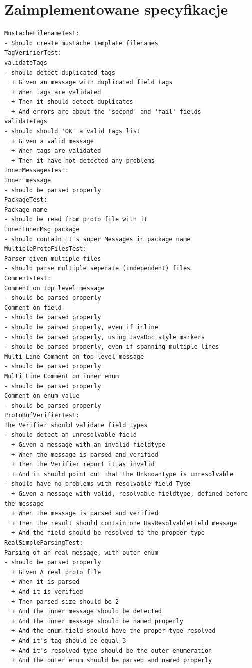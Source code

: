 \documentclass[pdflatex,11pt]{aghdpl}
\begin{document}
\section{Zaimplementowane specyfikacje}
\begin{verbatim}
MustacheFilenameTest:
- Should create mustache template filenames
TagVerifierTest:
validateTags 
- should detect duplicated tags
  + Given an message with duplicated field tags 
  + When tags are validated 
  + Then it should detect duplicates 
  + And errors are about the 'second' and 'fail' fields 
validateTags 
- should should 'OK' a valid tags list
  + Given a valid message 
  + When tags are validated 
  + Then it have not detected any problems 
InnerMessagesTest:
Inner message 
- should be parsed properly
PackageTest:
Package name 
- should be read from proto file with it
InnerInnerMsg package 
- should contain it's super Messages in package name
MultipleProtoFilesTest:
Parser given multiple files 
- should parse multiple seperate (independent) files
CommentsTest:
Comment on top level message 
- should be parsed properly
Comment on field 
- should be parsed properly
- should be parsed properly, even if inline
- should be parsed properly, using JavaDoc style markers
- should be parsed properly, even if spanning multiple lines
Multi Line Comment on top level message 
- should be parsed properly
Multi Line Comment on inner enum 
- should be parsed properly
Comment on enum value 
- should be parsed properly
ProtoBufVerifierTest:
The Verifier should validate field types 
- should detect an unresolvable field
  + Given a message with an invalid fieldtype 
  + When the message is parsed and verified 
  + Then the Verifier report it as invalid 
  + And it should point out that the UnknownType is unresolvable 
- should have no problems with resolvable field Type
  + Given a message with valid, resolvable fieldtype, defined before the message 
  + When the message is parsed and verified 
  + Then the result should contain one HasResolvableField message 
  + And the field should be resolved to the propper type 
RealSimpleParsingTest:
Parsing of an real message, with outer enum 
- should be parsed properly
  + Given A real proto file 
  + When it is parsed 
  + And it is verified 
  + Then parsed size should be 2 
  + And the inner message should be detected 
  + And the inner message should be named properly 
  + And the enum field should have the proper type resolved 
  + And it's tag should be equal 3 
  + And it's resolved type should be the outer enumeration 
  + And the outer enum should be parsed and named properly 

\end{verbatim}
\end{document}
